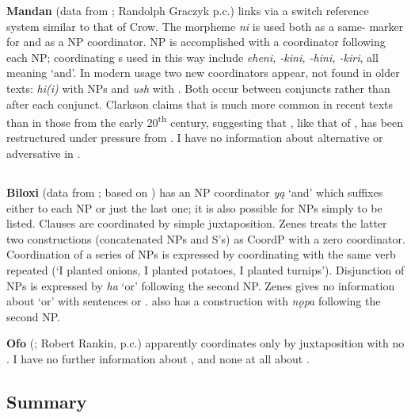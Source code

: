 \documentclass[output=paper]{LSP/langsci}
\begin{document}
\textbf{Mandan} (data from \citealt{Clarkson2012}; Randolph Graczyk p.c.) links  via a switch reference system similar to that of Crow. The morpheme \textit{ni} is used both as a same- marker for  and as a NP coordinator. NP  is accomplished with a coordinator following each NP; coordinating s used in this way include \textit{eheni, -kini, -hini, -kiri}, all meaning `and'. In modern usage two new coordinators appear, not found in older texts: \textit{hi(i)} with NPs and \textit{ush} with . Both occur between conjuncts rather than after each conjunct. Clarkson claims that  is much more common in recent texts than in those from the early 20\textsuperscript{th} century, suggesting that  , like that of , has been restructured under pressure from . I have no information about alternative or adversative  in .  

\subsection{}
 
\textbf{Biloxi} (data from \citealt{Zenes2009}; based on \citealt{DorseySwanton1912}) has an NP coordinator \textit{y\k{a}} `and' which suffixes either to each NP or just the last one; it is also possible for NPs simply to be listed. Clauses are coordinated by simple juxtaposition. Zenes treats the latter two constructions (concatenated NPs and S's) as CoordP with a zero coordinator. Coordination of a series of  NPs is expressed by coordinating  with the same verb repeated (`I planted onions, I planted potatoes, I planted turnips'). Disjunction of NPs is expressed by \textit{ha} `or' following the second NP. Zenes gives no information about `or' with sentences or .  also has a  construction with \textit{n\k{o}pa} following the second NP.

\textbf{Ofo} (\citealt{DorseySwanton1912}; Robert Rankin, p.c.) apparently coordinates  only by juxtaposition with no . I have no further information about  , and none at all about .

\subsection{Summary}
\end{document}
